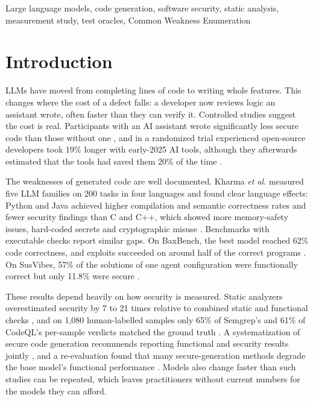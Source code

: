 \documentclass[conference]{IEEEtran}
\begin{document}
\begin{IEEEkeywords}
Large language models, code generation, software security, static analysis,
measurement study, test oracles, Common Weakness Enumeration
\end{IEEEkeywords}

\section{Introduction}

LLMs have moved from completing lines of code to writing whole features. This
changes where the cost of a defect falls: a developer now reviews logic an
assistant wrote, often faster than they can verify it. Controlled studies
suggest the cost is real. Participants with an AI assistant wrote
significantly less secure code than those without one \cite{perry2023}, and in
a randomized trial experienced open-source developers took 19\% longer with
early-2025 AI tools, although they afterwards estimated that the tools had saved
them 20\% of the time \cite{metr2025}.

The weaknesses of generated code are well documented. Kharma \textit{et al.}
measured five LLM families on 200 tasks in four languages and found clear
language effects: Python and Java achieved higher compilation and semantic
correctness rates and fewer security findings than C and C++, which showed more
memory-safety issues, hard-coded secrets and cryptographic misuse
\cite{kharma2026}. Benchmarks with executable checks report similar gaps. On
BaxBench, the best model reached 62\% code correctness, and exploits succeeded
on around half of the correct programs \cite{baxbench2025}. On SusVibes, 57\% of
the solutions of one agent configuration were functionally correct but only
11.8\% were secure \cite{susvibes2026}.

These results depend heavily on how security is measured. Static analyzers
overestimated security by 7 to 21 times relative to combined static and
functional checks \cite{tessa2026}, and on 1,080 human-labelled samples only
65\% of Semgrep's and 61\% of CodeQL's per-sample verdicts matched the ground
truth \cite{firouzi2026}. A systematization of secure code generation
recommends reporting functional and security results jointly
\cite{sok2026}, and a re-evaluation found that many secure-generation methods
degrade the base model's functional performance \cite{dai2025}. Models also
change faster than such studies can be repeated, which leaves practitioners
without current numbers for the models they can afford.
\end{document}
